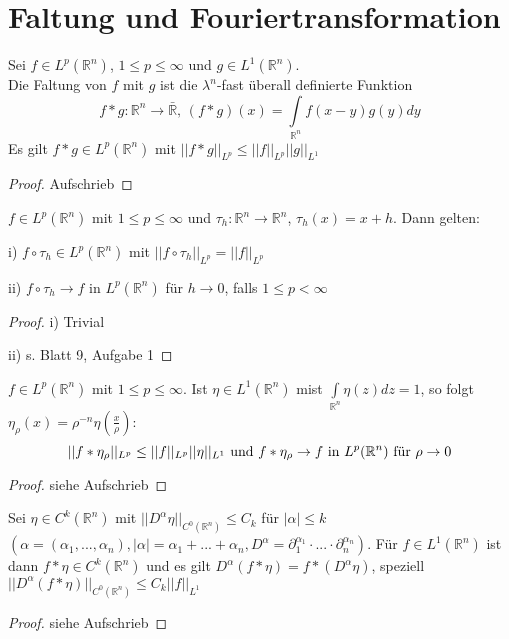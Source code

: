 \chapter{Faltung und Fouriertransformation}
\begin{theorem}
	Sei $f\in L^p(\mathbb{R}^n)$, $1\leq p \leq \infty$ und $g\in L^1(\mathbb{R}^n)$. \\
	Die Faltung von $f$ mit $g$ ist die $\lambda^n$-fast überall definierte Funktion 
	$$ f\ast g: \mathbb{R}^n \to \mathbb{\bar{R}}\text{, } (f\ast g)(x) = \int\limits_{\mathbb{R}^n} f(x-y) g(y) dy $$
	Es gilt $f\ast g\in L^p(\mathbb{R}^n)$ mit $||f\ast g||_{L^p} \leq ||f||_{L^p} ||g||_{L^1}$
\end{theorem}
\begin{proof}
Aufschrieb
\end{proof}

\begin{lemma}
	$f\in L^p(\mathbb{R}^n)$ mit $1\leq p \leq \infty$ und $\tau_h: \mathbb{R}^n\to \mathbb{R}^n$, $\tau_h(x)=x+h$. Dann gelten:
	\item[i)] $f\circ \tau_h \in L^p(\mathbb{R}^n)$ mit $||f\circ \tau_h ||_{L^p} = ||f||_{L^p}$
	\item[ii)] $f\circ \tau_h \to f$ in $L^p(\mathbb{R}^n)$ für $h\to 0$, falls $1\leq p < \infty$
\end{lemma}
\begin{proof}
	\item[i)] Trivial
	\item[ii)] s. Blatt 9, Aufgabe 1
\end{proof}

\begin{theorem}
	$f\in L^p(\mathbb{R}^n)$ mit $ 1\leq p \leq \infty$. Ist $\eta \in L^1(\mathbb{R}^n)$ mist $\int\limits_{\mathbb{R}^n} \eta(z) dz = 1$, so folgt $\eta_\rho (x) = \rho^{-n} \eta(\frac{x}{\rho})$: 
	\begin{equation*}
		||f\ast \eta_\rho||_{L^p} \leq ||f||_{L^p} ||\eta||_{L^1} \\
		\text{ und } \\
		f\ast \eta_\rho \to f \text{ in } L^p(\mathbb{R}^n) \text{ für } \rho \to 0
	\end{equation*}
\end{theorem}

\begin{proof}
	siehe Aufschrieb
\end{proof}

\begin{theorem}
	Sei $\eta \in C^k(\mathbb{R}^n)$ mit $|| D^\alpha \eta ||_{C^0(\mathbb{R}^n)} \leq C_k$ für $|\alpha| \leq k$ $(\alpha = (\alpha_1, ..., \alpha_n), |\alpha| = \alpha_1+...+\alpha_n, D^\alpha = \partial_1^{\alpha_1}\cdot ... \cdot \partial_n^{\alpha_n})$. Für $f \in L^1(\mathbb{R}^n)$ ist dann $f\ast \eta \in C^k(\mathbb{R}^n)$ und es gilt $D^\alpha (f\ast \eta) = f\ast (D^\alpha \eta)$, speziell $||D^\alpha(f\ast \eta)||_{C^0(\mathbb{R}^n)} \leq C_k ||f||_{L^1}$
\end{theorem}
\begin{proof}
	siehe Aufschrieb
\end{proof}

